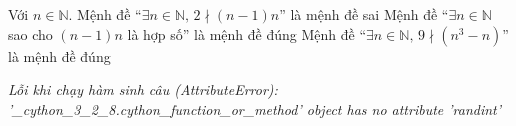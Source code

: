 \documentclass[a4paper,12pt]{article}
\begin{document}
\begin{center}
\newcommand{\tieude}[5]{
	\def\customtitle{#3}
	\ifthenelse{\equal{\customtitle}{}}
		{\def\thetitle{ÔN TẬP KIỂM TRA}}
		{\def\thetitle{\customtitle}}
	\noindent
	\begin{minipage}[b]{8.5cm}
		\centerline{\textbf{\fontsize{11}{0}\selectfont \hspace{2cm} TRƯỜNG THPT CHUYÊN HÙNG VƯƠNG}}
		\centerline{(\textit{Đề thi có #1\ trang})}
	\end{minipage}\hspace{1.5cm}
	\begin{minipage}[b]{9cm}
		\centerline{\textbf{\fontsize{11}{0}\selectfont \thetitle}}
		\centerline{\textbf{\fontsize{11}{0}\selectfont MÔN TOÁN, LỚP #5 (KHÔNG CHUYÊN)}}
	\end{minipage}\\
	\vspace{0.4cm}
	\ifthenelse{\equal{#4}{gv}}
		{\rightline{
			\setlength\fboxrule{1pt}
			\setlength\fboxsep{4pt}
			\fbox{\bf Mã đề #2}
		}}
		{}
	\vspace{4pt}
}
\end{center}

\begin{ex}%
Với $n \in \mathbb{N}$.
{\True Mệnh đề ``$\exists n \in \mathbb{N},\, 2 \nmid (n-1)n$'' là mệnh đề sai}
{\True Mệnh đề ``$\exists n \in \mathbb{N}$ sao cho $(n-1)n$ là hợp số'' là mệnh đề đúng}
{\True Mệnh đề ``$\exists n \in \mathbb{N},\, 9 \nmid (n^3-n)$'' là mệnh đề đúng}

\end{ex}

\begin{center}\end{center}

\begin{center}{\small\textit{Lỗi khi chạy hàm sinh câu (AttributeError): '\_cython\_3\_2\_8.cython\_function\_or\_method' object has no attribute 'randint'}}\end{center}
\end{document}
